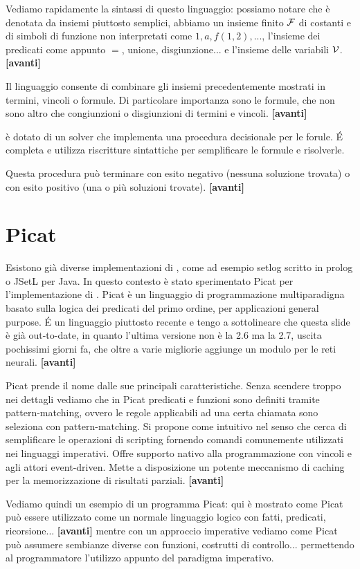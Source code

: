 \documentclass[11pt]{article}
\newcommand*{\nextslide}{\textbf{[avanti]}}
\begin{document}
Vediamo rapidamente la sintassi di questo linguaggio: possiamo notare
che è denotata da insiemi piuttosto semplici, abbiamo un insieme
finito $\mathcal{F}$ di costanti e di simboli di funzione non interpretati
come $1, a, f(1,2), ...$, l'insieme dei predicati come appunto $=$,
unione, disgiunzione... e l'insieme delle variabili
$\mathcal{V}$. \nextslide{}

Il linguaggio consente di combinare gli insiemi precedentemente
mostrati in termini, vincoli o formule. Di particolare importanza sono
le formule, che non sono altro che congiunzioni o disgiunzioni di
termini e vincoli. \nextslide{}

\lset{} è dotato di un solver che implementa una procedura decisionale
per le forule. \'E completa e utilizza riscritture sintattiche per
semplificare le formule e risolverle.

Questa procedura può terminare con esito negativo (nessuna soluzione
trovata) o con esito positivo (una o più soluzioni trovate).
\nextslide{}

\section*{Picat}

Esistono già diverse implementazioni di \lset{}, come ad esempio
setlog scritto in prolog o JSetL per Java. In questo contesto è stato
sperimentato Picat per l'implementazione di \lset{}. Picat è un
linguaggio di programmazione multiparadigna basato sulla logica dei
predicati del primo ordine, per applicazioni general purpose. \'E un
linguaggio piuttosto recente e tengo a sottolineare che questa slide è
già out-to-date, in quanto l'ultima versione non è la 2.6 ma la 2.7,
uscita pochissimi giorni fa, che oltre a varie migliorie aggiunge un
modulo per le reti neurali. \nextslide{}

Picat prende il nome dalle sue principali caratteristiche. Senza
scendere troppo nei dettagli vediamo che in Picat predicati e funzioni
sono definiti tramite pattern-matching, ovvero le regole applicabili
ad una certa chiamata sono seleziona con pattern-matching. Si propone
come intuitivo nel senso che cerca di semplificare le operazioni di
scripting fornendo comandi comunemente utilizzati nei linguaggi
imperativi. Offre supporto nativo alla programmazione con vincoli e
agli attori event-driven. Mette a disposizione un potente meccanismo
di caching per la memorizzazione di risultati parziali. \nextslide{}

Vediamo quindi un esempio di un programma Picat: qui è mostrato come
Picat può essere utilizzato come un normale linguaggio logico con
fatti, predicati, ricorsione... \nextslide{} mentre con un approccio
imperative vediamo come Picat può assumere sembianze diverse con 
funzioni, costrutti di controllo... permettendo al programmatore
l'utilizzo appunto del paradigma imperativo.
\end{document}
